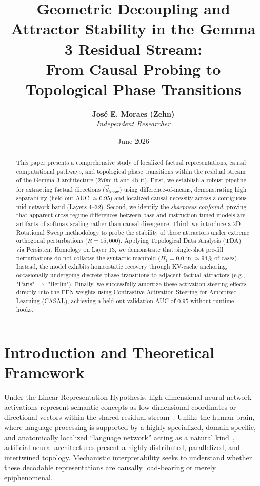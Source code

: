 \documentclass[10pt,journal,onecolumn]{article}
\title{\textbf{Geometric Decoupling and Attractor Stability in the Gemma 3 Residual Stream:\\ From Causal Probing to Topological Phase Transitions}}
\author{\textbf{José E. Moraes (Zehn)} \\ \textit{Independent Researcher} }
\date{June 2026}
\begin{document}
\maketitle

\begin{abstract}
This paper presents a comprehensive study of localized factual representations, causal computational pathways, and topological phase transitions within the residual stream of the Gemma 3 architecture (270m-it and 4b-it). First, we establish a robust pipeline for extracting factual directions ($\vec{d}_{\text{know}}$) using difference-of-means, demonstrating high separability (held-out AUC $\approx 0.95$) and localized causal necessity across a contiguous mid-network band (Layers 4--32). Second, we identify the \textit{sharpness confound}, proving that apparent cross-regime differences between base and instruction-tuned models are artifacts of softmax scaling rather than causal divergence. Third, we introduce a 2D Rotational Sweep methodology to probe the stability of these attractors under extreme orthogonal perturbations ($R = 15,000$). Applying Topological Data Analysis (TDA) via Persistent Homology on Layer 13, we demonstrate that single-shot pre-fill perturbations do not collapse the syntactic manifold ($H_1 = 0.0$ in $\approx 94\%$ of cases). Instead, the model exhibits homeostatic recovery through KV-cache anchoring, occasionally undergoing discrete phase transitions to adjacent factual attractors (e.g., "Paris" $\to$ "Berlin"). Finally, we successfully amortize these activation-steering effects directly into the FFN weights using Contrastive Activation Steering for Amortized Learning (CASAL), achieving a held-out validation AUC of $0.95$ without runtime hooks.
\end{abstract}

\newpage

\section{Introduction and Theoretical Framework}
\label{sec:introduction}

Under the Linear Representation Hypothesis, high-dimensional neural network activations represent semantic concepts as low-dimensional coordinates or directional vectors within the shared residual stream~\cite{lieberum2024gemma, ferrando2025do}. Unlike the human brain, where language processing is supported by a highly specialized, domain-specific, and anatomically localized ``language network'' acting as a natural kind~\cite{fedorenko2024language}, artificial neural architectures present a highly distributed, parallelized, and intertwined topology. Mechanistic interpretability seeks to understand whether these decodable representations are causally load-bearing or merely epiphenomenal.
\end{document}
